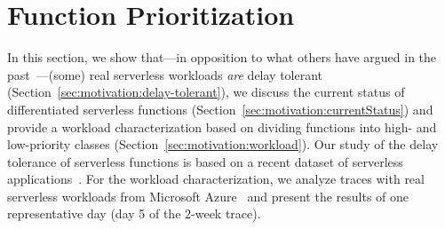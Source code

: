 \section{Function Prioritization}
\label{sec:qos:motivation}

In this section, we show that---in opposition to what others have argued in the past~\cite{Wiesner:Middleware:2021:TemporalShifting}---(some) real serverless workloads \emph{are} delay tolerant (Section~\ref{sec:motivation:delay-tolerant}), we discuss the current status of differentiated serverless functions (Section~\ref{sec:motivation:currentStatus}) and provide a workload characterization based on dividing functions into high- and low-priority classes (Section~\ref{sec:motivation:workload}).
Our study of the delay tolerance of serverless functions is based on a recent dataset of serverless applications~\cite{Eismann:Software:2021:Why,Eismann:TSE:2021:CommunityConsensus}.
For the workload characterization, we analyze traces with real serverless workloads from Microsoft Azure~\cite{shahrad2020serverless} and present the results of one representative day (day 5 of the 2-week trace).

